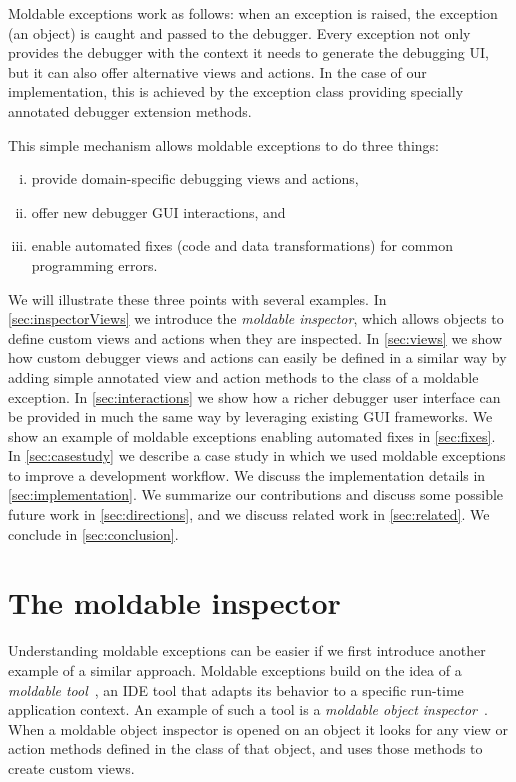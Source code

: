 \documentclass[sigplan,10pt]{acmart}
\begin{document}
Moldable exceptions work as follows: when an exception is raised, the exception (an object) is caught and passed to the debugger.
Every exception not only provides the debugger with the context it needs to generate the debugging UI, but it can also offer alternative views and actions.
In the case of our implementation, this is achieved by the exception class providing specially annotated debugger extension methods.

This simple mechanism allows moldable exceptions to do three things:
\begin{enumerate}[(i)]
	\item provide domain-specific debugging views and actions,
	\item offer new debugger GUI interactions, and
	\item enable automated fixes (code and data transformations) for common programming errors.
\end{enumerate}

We will illustrate these three points with several examples.
In \autoref{sec:inspectorViews} we introduce the \emph{moldable inspector}, which allows objects to define custom views and actions when they are inspected.
In \autoref{sec:views} we show how custom debugger views and actions can easily be defined in a similar way by adding simple annotated view and action methods to the class of a moldable exception.
In \autoref{sec:interactions} we show how a richer debugger user interface can be provided in much the same way by leveraging existing GUI frameworks.
We show an example of moldable exceptions enabling automated fixes in \autoref{sec:fixes}.
In \autoref{sec:casestudy} we describe a case study in which we used moldable exceptions to improve a development workflow.
We discuss the implementation details in \autoref{sec:implementation}.
We summarize our contributions and discuss some possible future work in \autoref{sec:directions}, and we discuss related work in \autoref{sec:related}.
We conclude in \autoref{sec:conclusion}.

\section{The moldable inspector}\label{sec:inspectorViews}

Understanding moldable exceptions can be easier if we first introduce another example of a similar approach.
Moldable exceptions build on the idea of a \emph{moldable tool}~\cite{Chis17a}, an IDE tool that adapts its behavior to a specific run-time application context.
An example of such a tool is a \emph{moldable object inspector}~\cite{Chis15a}.
When a moldable object inspector is opened on an object it looks for any view or action methods defined in the class of that object, and uses those methods to create custom views.
\end{document}
